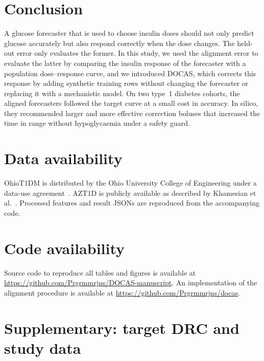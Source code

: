 \documentclass[a4paper,fleqn]{cas-sc}
\begin{document}
\section{Conclusion}\label{sec:conclusion}

A glucose forecaster that is used to choose insulin doses should not only
predict glucose accurately but also respond correctly when the dose changes.
The held-out error only evaluates the former. In this study, we used the
alignment error to evaluate the latter by comparing the insulin response of the
forecaster with a population dose--response curve, and we introduced DOCAS,
which corrects this response by adding synthetic training rows without
changing the forecaster or replacing it with a mechanistic model. On two
type~1 diabetes cohorts, the aligned forecasters followed the target curve at a
small cost in accuracy. In silico, they recommended larger and more effective
correction boluses that increased the time in range without hypoglycaemia under
a safety guard.

\section*{Data availability}
OhioT1DM is distributed by the Ohio University College of Engineering under a
data-use agreement~\citep{marling2020}. AZT1D is publicly available as described by
Khamesian et al.~\citep{khamesian2025azt1d,khamesian2025azt1ddata}.
Processed features and result JSONs are reproduced from the accompanying code.

\section*{Code availability}
Source code to reproduce all tables and figures is available at
\url{https://github.com/Prgrmmrjns/DOCAS-manuscript}.
An implementation of the alignment procedure is available at
\url{https://github.com/Prgrmmrjns/docas}.

\appendix

\section{Supplementary: target DRC and study data}\label{app:target-data}
\end{document}

